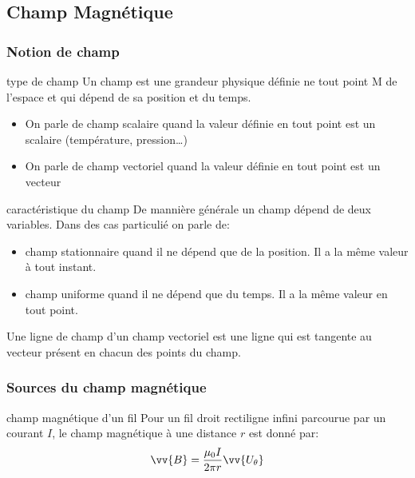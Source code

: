 \subsection{Champ Magnétique}

\subsubsection{Notion de champ}

\begin{definition}{type de champ}{}
    Un champ est une grandeur physique définie ne tout point M de l'espace et qui dépend de sa position et du temps.
    \begin{itemize}
        \item On parle de champ scalaire quand la valeur définie en tout point est un scalaire (température, pression\dots)
        \item On parle de champ vectoriel quand la valeur définie en tout point est un vecteur
    \end{itemize}
\end{definition}

\begin{definition}{caractéristique du champ}{}
    De mannière générale un champ dépend de deux variables. Dans des cas particulié on parle de:
    \begin{itemize}
        \item champ stationnaire quand il ne dépend que de la position. Il a la même valeur à tout instant.
        \item champ uniforme quand il ne dépend que du temps. Il a la même valeur en tout point.
    \end{itemize}
\end{definition}

\begin{definition}{}{}
    Une ligne de champ d'un champ vectoriel est une ligne qui est tangente au vecteur présent en chacun des points du champ.
\end{definition}

\subsubsection{Sources du champ magnétique}

\begin{proposition}{champ magnétique d'un fil}{}
    Pour un fil droit rectiligne infini parcourue par un courant $I$, le champ magnétique à une distance $r$ est donné par:
    \[ \vv{B} = \frac{\mu_{0} I}{2\pi r} \vv{U_{\theta}}\]
\end{proposition}

